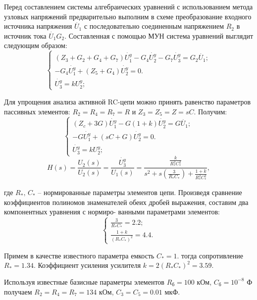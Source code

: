 \documentclass[a4paper,14pt ]{article} %
\begin{document}
   Перед
составлением системы алгебраических уравнений с использованием метода
узловых напряжений предварительно выполним в схеме преобразование
входного источника напряжения $\dot{U_1}$ с последовательно соединенным напряжением
$R_2$ в источник тока $\dot{U_1}G_2$.
Составленная с помощью МУН система уравнений выглядит следующим образом:
\begin{equation}
    \begin{cases}
        (Z_3 + G_2 + G_4 + G_7)\dot{U_1^y} - G_4\dot{U_2^y} - G_7\dot{U_3^y} = G_2\dot{U_1};\\
        -G_4\dot{U_1^y} +(Z_5 + G_4)\dot{U_2^y} = 0.\\
        \dot{U_3^y} = kU_2^y;
    \end{cases}
\end{equation} 

Для упрощения анализа активной
RC-цепи можно принять равенство параметров пассивных элементов:
$R_2 = R_4 = R_7 = R$ и $Z_3 = Z_5 = Z = sC$.
Получим:
\begin{equation}
    \begin{cases}
        (Z_c + 3G)\dot{U_1^y} - G(1+k)\dot{U_2^y} = G\dot{U_1};\\
        -G\dot{U_1^y} +(sC + G)\dot{U_2^y} = 0.\\
        \dot{U_3^y} = kU_2^y;
    \end{cases}
\end{equation}
\begin{equation}
    H(s) = \frac{U_2(s)}{U_2(s)} = \frac{\dot{U_3^y}}{U_1(s)} = 
    \frac{\frac{k}{R_*^2C_*^2}}{s^2 + s\left(\frac{3}{R_*C_*}\right) + \frac{1+k}{R_*^2C_*^2}},
\end{equation}

где $R_*, \, C_*$ -- нормированные параметры элементов цепи.
Произведя сравнение коэффициентов полиномов знаменателей обеих
дробей выражения, составим два компонентных уравнения с нормиро-
ванными параметрами элементов:
\begin{equation}
    \begin{cases}
        \frac{3}{R_*C_*} = 2.2;\\
        \frac{1+k}{(R_*C_*)^2} = 4.4.
    \end{cases}
\end{equation}

Примем в качестве известного параметра емкость $C_* = 1$. тогда
сопротивление $R_* = 1.34$. Коэффициент усиления усилителя $k = 2(R_*C_*)^2 = 3.59$.

Используя известные базисные параметры элементов $R_\text{б} = 100$ кОм, $C_\text{б} = 10^{-8}$ Ф 
получаем $R_2 = R_4 = R_7 = 134$ кОм, $C_3 = C_5 = 0.01$ мкФ.
\end{document}
